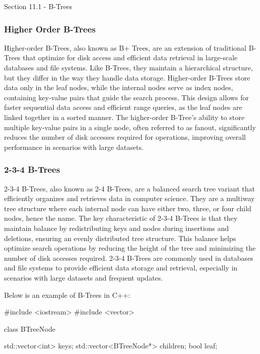 \begin{notes}{Section 11.1 - B-Trees}
    \subsubsection*{Higher Order B-Trees}
    
    Higher-order B-Trees, also known as B+ Trees, are an extension of traditional B-Trees that optimize for disk access and efficient data retrieval in large-scale databases and file systems. Like B-Trees, they maintain a hierarchical structure, but they differ in the way they handle data storage. Higher-order B-Trees store data only in the leaf 
    nodes, while the internal nodes serve as index nodes, containing key-value pairs that guide the search process. This design allows for faster sequential data access and efficient range queries, as the leaf nodes are linked together in a sorted manner. The higher-order B-Tree's ability to store multiple key-value pairs in a single node, often referred 
    to as fanout, significantly reduces the number of disk accesses required for operations, improving overall performance in scenarios with large datasets.
    
    \subsubsection*{2-3-4 B-Trees}
    
    2-3-4 B-Trees, also known as 2-4 B-Trees, are a balanced search tree variant that efficiently organizes and retrieves data in computer science. They are a multiway tree structure where each internal node can have either two, three, or four child nodes, hence the name. The key characteristic of 2-3-4 B-Trees is that they maintain balance by redistributing 
    keys and nodes during insertions and deletions, ensuring an evenly distributed tree structure. This balance helps optimize search operations by reducing the height of the tree and minimizing the number of disk accesses required. 2-3-4 B-Trees are commonly used in databases and file systems to provide efficient data storage and retrieval, especially 
    in scenarios with large datasets and frequent updates.
    
    \begin{highlight}
        Below is an example of B-Trees in C++:
    
    \begin{code}[C++]
    #include <iostream>
    #include <vector>
    
    class BTreeNode {
        std::vector<int> keys;
        std::vector<BTreeNode*> children;
        bool leaf;
    
}
\end{code}
\end{highlight}
\end{notes}
